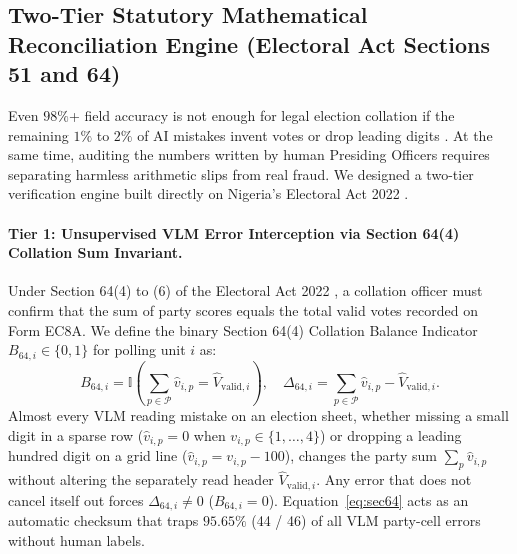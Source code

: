 \documentclass{article}
\begin{document}
\subsection{Two-Tier Statutory Mathematical Reconciliation Engine (Electoral Act Sections 51 and 64)}

Even $98\%$+ field accuracy is not enough for legal election collation if the remaining $1\%$ to $2\%$ of AI mistakes invent votes or drop leading digits \cite{kimani2022using,zhang2026wildhandbench}. At the same time, auditing the numbers written by human Presiding Officers requires separating harmless arithmetic slips from real fraud. We designed a two-tier verification engine built directly on Nigeria's Electoral Act 2022 \cite{inec2022electoral}.

\paragraph{Tier 1: Unsupervised VLM Error Interception via Section 64(4) Collation Sum Invariant.}
Under Section 64(4) to (6) of the Electoral Act 2022 \cite{inec2022electoral}, a collation officer must confirm that the sum of party scores equals the total valid votes recorded on Form EC8A. We define the binary Section 64(4) Collation Balance Indicator $B_{64, i} \in \{0, 1\}$ for polling unit $i$ as:
\begin{equation}
B_{64, i} = \mathbb{I}\!\left( \sum_{p \in \mathcal{P}} \hat{v}_{i, p} = \hat{V}_{\text{valid}, i} \right), \quad \Delta_{64, i} = \sum_{p \in \mathcal{P}} \hat{v}_{i, p} - \hat{V}_{\text{valid}, i}.
\label{eq:sec64}
\end{equation}
Almost every VLM reading mistake on an election sheet, whether missing a small digit in a sparse row ($\hat{v}_{i,p} = 0$ when $v_{i,p} \in \{1,\dots,4\}$) or dropping a leading hundred digit on a grid line ($\hat{v}_{i,p} = v_{i,p} - 100$), changes the party sum $\sum_p \hat{v}_{i,p}$ without altering the separately read header $\hat{V}_{\text{valid}, i}$. Any error that does not cancel itself out forces $\Delta_{64, i} \ne 0$ ($B_{64, i} = 0$). Equation~\ref{eq:sec64} acts as an automatic checksum that traps $95.65\%$ (44 / 46) of all VLM party-cell errors without human labels.
\end{document}
